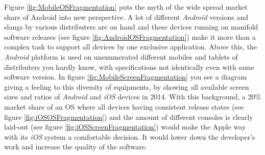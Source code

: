 Figure \vref{fig:MobileOSFragmentation} puts the myth of the wide spread market share of Android into new perspective. A lot of different \emph{Android} versions and slangs by various distributers are on hand and these devices running on manifold software releases (see figure \vref{fig:AndroidOSFragmentation}) make it more than a complex task to support all devices by one exclusive application. Above this, the \emph{Android} platform is used on unenumerated different mobiles and tablets of distributers you hardly know, with specifications not identically even with same software version. In figure \vref{fig:MobileScreenFragmentation} you see a diagram giving a feeling to this diversity of equipments, by showing all available screen sizes and ratios of \emph{Android} and \emph{iOS} devices in 2014. With this background, a 20\% market share of an \gls{OS} where all devices having consistent release states (see figure \vref{fig:iOSOSFragmentation}) and the amount of different consoles is clearly laid-out (see figure \vref{fig:iOSScreenFragmentation}) would make the Apple way with its \emph{iOS} system a comfortable decision. It would lower down the developer's work and increase the quality of the software.

